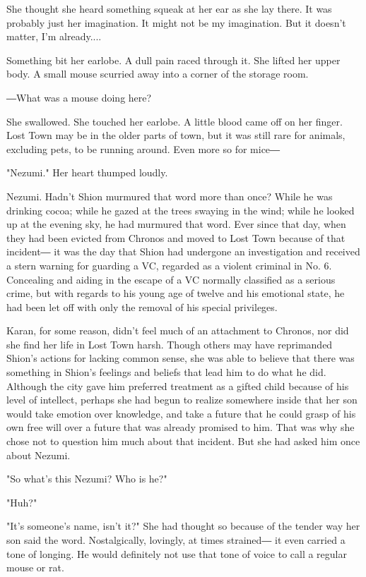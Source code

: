 She thought she heard something squeak at her ear as she lay there. It
was probably just her imagination. It might not be my imagination. But
it doesn't matter, I'm already....

Something bit her earlobe. A dull pain raced through it. She lifted her
upper body. A small mouse scurried away into a corner of the storage
room.

―What was a mouse doing here?

She swallowed. She touched her earlobe. A little blood came off on her
finger. Lost Town may be in the older parts of town, but it was still
rare for animals, excluding pets, to be running around. Even more so for
mice―

"Nezumi." Her heart thumped loudly.

Nezumi. Hadn't Shion murmured that word more than once? While he was
drinking cocoa; while he gazed at the trees swaying in the wind; while
he looked up at the evening sky, he had murmured that word. Ever since
that day, when they had been evicted from Chronos and moved to Lost Town
because of that incident― it was the day that Shion had undergone an
investigation and received a stern warning for guarding a VC, regarded
as a violent criminal in No. 6. Concealing and aiding in the escape of a
VC normally classified as a serious crime, but with regards to his young
age of twelve and his emotional state, he had been let off with only the
removal of his special privileges.

Karan, for some reason, didn't feel much of an attachment to Chronos,
nor did she find her life in Lost Town harsh. Though others may have
reprimanded Shion's actions for lacking common sense, she was able to
believe that there was something in Shion's feelings and beliefs that
lead him to do what he did. Although the city gave him preferred
treatment as a gifted child because of his level of intellect, perhaps
she had begun to realize somewhere inside that her son would take
emotion over knowledge, and take a future that he could grasp of his own
free will over a future that was already promised to him. That was why
she chose not to question him much about that incident. But she had
asked him once about Nezumi.

"So what's this Nezumi? Who is he?"

"Huh?"

"It's someone's name, isn't it?" She had thought so because of the
tender way her son said the word. Nostalgically, lovingly, at times
strained― it even carried a tone of longing. He would definitely not use
that tone of voice to call a regular mouse or rat.

